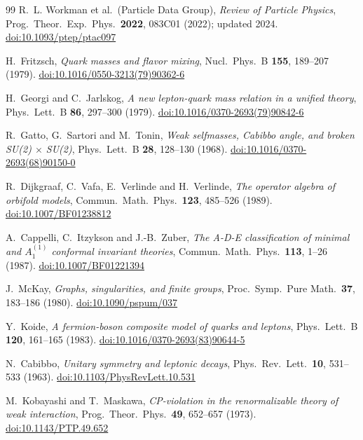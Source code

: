 \documentclass[11pt,a4paper]{article}
\theoremstyle{definition}
\theoremstyle{remark}
\begin{document}
\begin{thebibliography}{99}
R.~L. Workman et al.\ (Particle Data Group),
\textit{Review of Particle Physics},
Prog.\ Theor.\ Exp.\ Phys.\ \textbf{2022}, 083C01 (2022);
updated 2024.
\href{https://doi.org/10.1093/ptep/ptac097}{doi:10.1093/ptep/ptac097}

H.~Fritzsch,
\textit{Quark masses and flavor mixing},
Nucl.\ Phys.\ B \textbf{155}, 189--207 (1979).
\href{https://doi.org/10.1016/0550-3213(79)90362-6}{doi:10.1016/0550-3213(79)90362-6}

H.~Georgi and C.~Jarlskog,
\textit{A new lepton-quark mass relation in a unified theory},
Phys.\ Lett.\ B \textbf{86}, 297--300 (1979).
\href{https://doi.org/10.1016/0370-2693(79)90842-6}{doi:10.1016/0370-2693(79)90842-6}

R.~Gatto, G.~Sartori and M.~Tonin,
\textit{Weak selfmasses, Cabibbo angle, and broken SU(2) $\times$ SU(2)},
Phys.\ Lett.\ B \textbf{28}, 128--130 (1968).
\href{https://doi.org/10.1016/0370-2693(68)90150-0}{doi:10.1016/0370-2693(68)90150-0}

R.~Dijkgraaf, C.~Vafa, E.~Verlinde and H.~Verlinde,
\textit{The operator algebra of orbifold models},
Commun.\ Math.\ Phys.\ \textbf{123}, 485--526 (1989).
\href{https://doi.org/10.1007/BF01238812}{doi:10.1007/BF01238812}

A.~Cappelli, C.~Itzykson and J.-B.~Zuber,
\textit{The A-D-E classification of minimal and $A_1^{(1)}$ conformal
  invariant theories},
Commun.\ Math.\ Phys.\ \textbf{113}, 1--26 (1987).
\href{https://doi.org/10.1007/BF01221394}{doi:10.1007/BF01221394}

J.~McKay,
\textit{Graphs, singularities, and finite groups},
Proc.\ Symp.\ Pure Math.\ \textbf{37}, 183--186 (1980).
\href{https://doi.org/10.1090/pspum/037}{doi:10.1090/pspum/037}

Y.~Koide,
\textit{A fermion-boson composite model of quarks and leptons},
Phys.\ Lett.\ B \textbf{120}, 161--165 (1983).
\href{https://doi.org/10.1016/0370-2693(83)90644-5}{doi:10.1016/0370-2693(83)90644-5}

N.~Cabibbo,
\textit{Unitary symmetry and leptonic decays},
Phys.\ Rev.\ Lett.\ \textbf{10}, 531--533 (1963).
\href{https://doi.org/10.1103/PhysRevLett.10.531}{doi:10.1103/PhysRevLett.10.531}

M.~Kobayashi and T.~Maskawa,
\textit{CP-violation in the renormalizable theory of weak interaction},
Prog.\ Theor.\ Phys.\ \textbf{49}, 652--657 (1973).
\href{https://doi.org/10.1143/PTP.49.652}{doi:10.1143/PTP.49.652}


\end{thebibliography}
\end{document}
